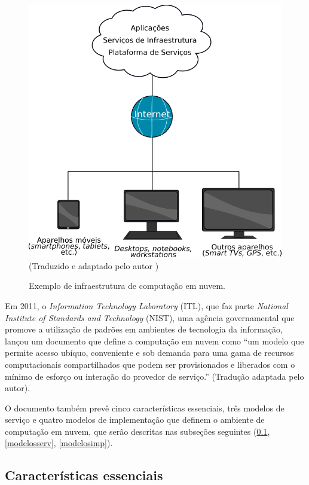 \documentclass[
	12pt,				%
	oneside,			%
	a4paper,			%
	chapter=TITLE,		%
	english,			%
	french,				%
	spanish,			%
	brazil				%
	]{abntex2}
\begin{document}
\begin{figure}[h]
	\caption{Exemplo de infraestrutura de computação em nuvem.}
	\includegraphics[scale=0.45]{compnuvem}
	\centering
	\label{fig:compnuvem}
	\\
	\centering \textual (Traduzido e adaptado pelo autor \cite{marston2011cloud})
\end{figure}

Em 2011, o \emph{Information Technology Laboratory} (ITL), que faz parte \emph{National Institute of Standards and Technology} (NIST), uma agência governamental que promove a utilização de padrões em ambientes de tecnologia da informação, lançou um documento que define a computação em nuvem como ``um modelo que permite acesso ubíquo, conveniente e sob demanda para uma gama de recursos computacionais compartilhados que podem ser provisionados e liberados com o mínimo de esforço ou interação do provedor de serviço.'' \cite[p. 2]{mell2011nist} (Tradução adaptada pelo autor).

O documento também prevê cinco características essenciais, três modelos de serviço e quatro modelos de implementação que definem o ambiente de computação em nuvem, que serão descritas nas subseções seguintes (\ref{caractessenciais}, \ref{modelosserv}, \ref{modelosimp}).

\subsection{Características essenciais}\label{caractessenciais}\label{sec_caracter}
\end{document}
